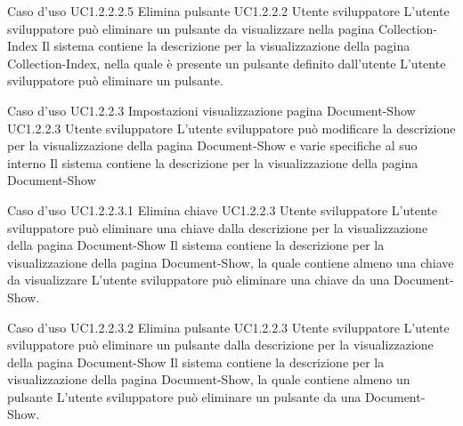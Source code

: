 \UCtitle
{Caso d'uso UC1.2.2.2.5}
{Elimina pulsante}
\UC
{UC1.2.2.2}
{Utente sviluppatore}
{L'utente sviluppatore  può eliminare un pulsante da visualizzare nella pagina Collection-Index}
{Il sistema contiene la descrizione per la visualizzazione della pagina Collection-Index, nella quale è presente un pulsante definito dall'utente}
\scenario
{L'utente sviluppatore può eliminare un pulsante.}


\UCtitle
{Caso d'uso UC1.2.2.3}
{Impostazioni visualizzazione pagina Document-Show}
\UC
{UC1.2.2.3}
{Utente sviluppatore}
{L'utente sviluppatore  può modificare la descrizione per la visualizzazione della pagina Document-Show e varie specifiche al suo interno}
{Il sistema contiene la descrizione per la visualizzazione della pagina Document-Show}


\UCtitle
{Caso d'uso UC1.2.2.3.1}
{Elimina chiave}
\UC
{UC1.2.2.3}
{Utente sviluppatore}
{L'utente sviluppatore  può eliminare una chiave  dalla descrizione per la visualizzazione della pagina Document-Show}
{Il sistema contiene la descrizione per la visualizzazione della pagina Document-Show, la quale contiene almeno una chiave da visualizzare}
\scenario
{L'utente sviluppatore può eliminare una chiave da una Document-Show.}

\UCtitle
{Caso d'uso UC1.2.2.3.2}
{Elimina pulsante}
\UC
{UC1.2.2.3}
{Utente sviluppatore}
{L'utente sviluppatore può eliminare un pulsante dalla descrizione per la visualizzazione della pagina Document-Show}
{Il sistema contiene la descrizione per la visualizzazione della pagina Document-Show, la quale contiene almeno un pulsante}
\scenario
{L'utente sviluppatore può eliminare un pulsante da una Document-Show.}

